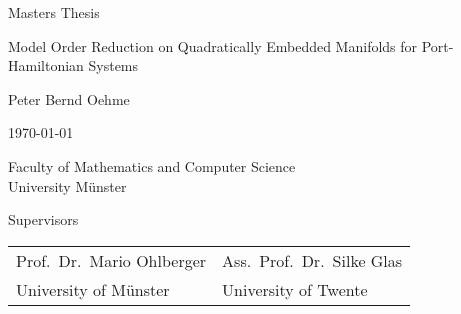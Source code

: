 \documentclass{article}
\begin{document}
    \begin{titlepage}
        \setlength{\parindent}{0pt}

        \begin{center}
            \vspace*{12em}

            Masters Thesis

            \vspace*{3em}

            {\Huge{Model Order Reduction on Quadratically Embedded Manifolds for Port-Hamiltonian Systems}\par}

            \vspace*{6em}

            {\Large{Peter Bernd Oehme}}

            \vspace*{\fill}

            \today

            \vspace*{3em}

            Faculty of Mathematics and Computer Science \\
            University Münster

            \vspace*{3em}

            

            \vspace*{3em}

            Supervisors

            \begin{tabularx}{\textwidth}{YY}
                Prof.\ Dr.\ Mario Ohlberger & Ass.\ Prof.\ Dr.\ Silke Glas \\
                University of Münster & University of Twente
            \end{tabularx}
        \end{center}
    \end{titlepage}
\end{document}
